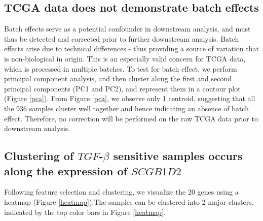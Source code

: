 \documentclass[a4paper,12pt]{article}
\begin{document}
\subsection{TCGA data does not demonstrate batch effects}
Batch effects serve as a potential confounder in downstream analysis,
and must thus be detected and corrected prior to further downstream
analysis. Batch effects arise due to technical differences - thus
providing a source of variation that is non-biological in origin. This
is an especially valid concern for TCGA data, which is processed in
multiple batches. To test for batch effect, we perform principal
component analysis, and then cluster along the first and second
principal components (PC1 and PC2), and represent them in a contour
plot (Figure \ref{pca}).
From Figure \ref{pca}, we observe only 1 centroid, suggesting that all
the 936 samples cluster well together and hence indicating an absence
of batch effect. Therefore, no correction will be performed on the raw
TCGA data prior to downstream analysis.

\subsection{Clustering of $\textit{TGF}$-$\beta$ sensitive samples occurs along the
  expression of $\textit{SCGB1D2}$}
Following feature selection and clustering, we visualize the 20 genes
using a heatmap (Figure \ref{heatmap}).The samples can be clustered
into 2 major clusters, indicated by the top color bars in Figure
\ref{heatmap}.
\end{document}
